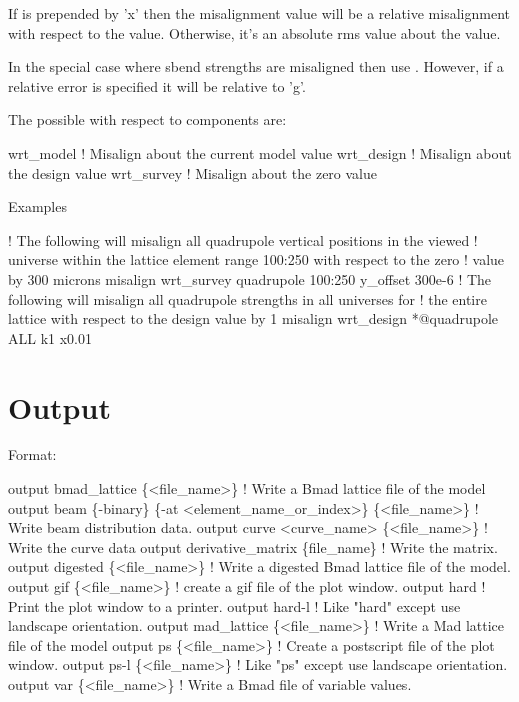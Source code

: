 If  is prepended by 'x' then the misalignment value will be
a relative misalignment with respect to the  value. Otherwise, it's an 
absolute rms value about the  value.

In the special case where sbend strengths are misaligned then use
. However, if a relative error is specified it will be 
relative to 'g'.

The possible with respect to components are:
\begin{example}
  wrt_model          ! Misalign about the current model value
  wrt_design         ! Misalign about the design value
  wrt_survey         ! Misalign about the zero value
\end{example}

Examples
\begin{example}
   ! The following will misalign all quadrupole vertical positions in the viewed
   ! universe within the lattice element range 100:250 with respect to the zero 
   ! value by 300 microns
  misalign wrt_survey quadrupole 100:250 y_offset 300e-6
   ! The following will misalign all quadrupole strengths in all universes for
   ! the entire lattice with respect to the design value by 1%
  misalign wrt_design *@quadrupole ALL k1 x0.01
\end{example}

\section{Output}
\label{s:output}

Format:
\begin{example}
  output bmad_lattice \{<file_name>\}       ! Write a Bmad lattice file of the model
  output beam \{-binary\} \{-at <element_name_or_index>\} \{<file_name>\} 
                                          ! Write beam distribution data.
  output curve <curve_name> \{<file_name>\} ! Write the curve data
  output derivative_matrix \{file_name\}    ! Write the  matrix.
  output digested \{<file_name>\}     ! Write a digested Bmad lattice file of the model.
  output gif \{<file_name>\}          ! create a gif file of the plot window.
  output hard                       ! Print the plot window to a printer.
  output hard-l                     ! Like "hard" except use landscape orientation. 
  output mad_lattice \{<file_name>\}  ! Write a Mad lattice file of the model
  output ps \{<file_name>\}           ! Create a postscript file of the plot window.
  output ps-l \{<file_name>\}         ! Like "ps" except use landscape orientation.
  output var \{<file_name>\}          ! Write a Bmad file of variable values.
\end{example}

